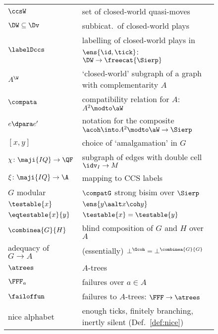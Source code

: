 \documentclass{LMCS}
\renewcommand{\QFI}{\maji{IQ}}
\renewcommand{\LLL}{\QFI}
\theoremstyle{plain}\newtheorem{satz}[thm]{Satz}
\begin{document}
\begin{figure}[p]
\begin{multicols}{2}
\begin{tabular}{lp{.7\linewidth}}
        $\ccsW$ & set of closed-world quasi-moves \\
        $\DW \subseteq \Dv$ & subbicat.\ of closed-world plays \\
        $\labelDccs$ &
        labelling of closed-world plays in $\ens{\id,\tick}$:
        $\DW \to \freecat{\Sierp}$ \\

        $A^\W$ & `closed-world' subgraph of a graph with complementarity $A$ \\
        $\compata$ & compatibility relation for $A$:  $A^2 \modto \aW$ \\
        $e \dpara e'$ & notation for the composite $\acoh \into A^2 \modto \aW \to \Sierp$ \\

        $[x,y]$ & choice of `amalgamation' in $G$ \\


$\chi \colon \LLL \to \QF$ & subgraph of edges with double cell $\idv_I \to M$ \\
        $\xi \colon \LLL \to \A$ & mapping to CCS labels \\
        
        $G$ modular &  $\compatG$ strong bisim over $\Sierp$ \\
        
        $\testable{x}$ & $\ens{y \aalt x \coh y}$ \\
        $\eqtestable{x}{y}$ & $\testable{x} = \testable{y}$ \\

        $\combinea{G}{H}$ & blind composition of $G$ and $H$ over $A$ \\
        \begin{minipage}[t]{.2\linewidth}
        adequacy of $G {\to} A$
        \end{minipage} &
        (essentially) $\bot^{\Gcoh} = \bot^{\combinea{G}{G}}$ \\
        
        $\atrees$ & $A$-trees \\
        $\FFF_a$ & failures over $a \in A$ \\
        $\failoffun$ & failures to $A$-trees: $\FFF \to \atrees$ \\
        nice alphabet & enough ticks, finitely branching, inertly silent 
        (Def.~\ref{def:nice}) \\
        

\end{tabular}
\end{multicols}
\end{figure}
\end{document}
